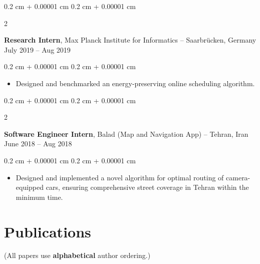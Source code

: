 \documentclass[10pt, letterpaper]{article}
\newenvironment{highlights}{
    \begin{itemize}[
        topsep=0.1 cm,
        parsep=0.10 cm,
        partopsep=0pt,
        itemsep=0pt,
        leftmargin=0.4 cm + 10pt
    ]
}{
    \end{itemize}
} %
\newenvironment{onecolentry}{
    \begin{adjustwidth}{
        0.2 cm + 0.00001 cm
    }{
        0.2 cm + 0.00001 cm
    }
}{
    \end{adjustwidth}
} %
\newenvironment{twocolentry}[2][]{
    \onecolentry
    \def\secondColumn{#2}
    \setcolumnwidth{\fill, 4.5 cm}
    \begin{paracol}{2}
}{
    \switchcolumn \raggedleft \secondColumn
    \end{paracol}
    \endonecolentry
} %
\begin{document}
        \vspace{0.2 cm}

        \begin{twocolentry}{
            July 2019 – Aug 2019
        }
            \textbf{Research Intern}, Max Planck Institute for Informatics -- Saarbrücken, Germany\end{twocolentry}

        \vspace{0.1 cm}
        \begin{onecolentry}
            \begin{highlights}
                \item Designed and benchmarked an energy-preserving online scheduling algorithm.
            \end{highlights}
        \end{onecolentry}


        \vspace{0.2 cm}

        \begin{twocolentry}{
            June 2018 – Aug 2018
        }
            \textbf{Software Engineer Intern}, Balad (Map and Navigation App) -- Tehran, Iran\end{twocolentry}

        \vspace{0.1 cm}
        \begin{onecolentry}
            \begin{highlights}
                \item Designed and implemented a novel algorithm for optimal routing of camera-equipped cars, ensuring comprehensive street coverage in Tehran within the minimum time.
            \end{highlights}
        \end{onecolentry}



    
    \section{Publications}



        (All papers use {\bf alphabetical} author ordering.)

        \vspace{0.2 cm}
\end{document}
